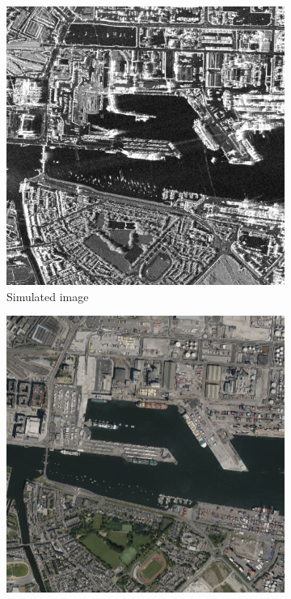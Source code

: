 \documentclass[
  lettersize  journal,
]{IEEEtran}%
\begin{document}
\begin{figure}[hbt]
    \centering
    \begin{subfigure}{0.25\textwidth}
        \includegraphics[width=\linewidth]{./Figures/dublin_1100_hh.png}
        \caption{Simulated image}
        \label{fig:dublin-sar}
    \end{subfigure}
    \hspace{0.00001\textwidth}
    \begin{subfigure}{0.25\textwidth}
        \includegraphics[width=\linewidth]{./Figures/dublin.png}

\end{subfigure}
\end{figure}
\end{document}

